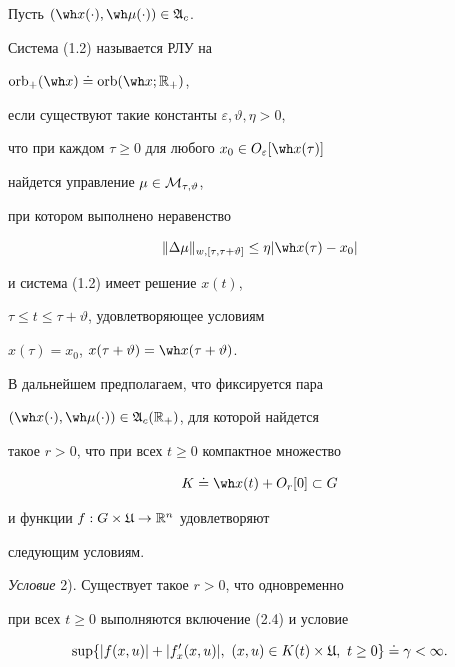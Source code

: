 \begin{defns}


Пусть $(\wh x(\cdot),\wh\mu(\cdot))\in\frak A_c$.


Система (1.2) называется РЛУ на


$\orb_+(\wh x)\doteq\orb(\wh x;\bR_+)$,


если существуют такие константы $\varepsilon,\vartheta,\eta>0$,


что при каждом $\tau\ge0$ для любого $x_0\in O_\varepsilon


[\wh x(\tau)]$


найдется управление $\mu\in\cal M_{\tau,\vartheta }$,


при котором выполнено неравенство


\begin{equation}


\|\Delta\mu\|_{w,[\tau,\tau+\vartheta]}\le\eta|\wh x(\tau)-x_0|


\end{equation}


и система (1.2) имеет решение $x(t)$,


$\tau\le t\le\tau+\vartheta$, удовлетворяющее условиям


$x(\tau)=x_0$, $x(\tau+\vartheta)=\wh x(\tau+\vartheta)$.


\end{defns}





В дальнейшем предполагаем, что фиксируется пара


$(\wh x(\cdot),\wh\mu(\cdot))\in\frak A_c(\bR_+)$, для которой найдется


такое $r>0$, что при всех $t\ge0$ компактное множество


\begin{equation}


K\doteq \wh x(t)+O_{r}[0]\subset G


\end{equation}


и функции $f:G\times\frak U\to\Bbb R^n$ удовлетворяют


следующим условиям.





{\it Условие} 2). Существует такое $r>0$, что одновременно


при всех $t\ge 0$ выполняются включение (2.4) и условие


\begin{equation}


\sup\{|f(x,u)|+|f'_{x}(x,u)|,\ (x,u)\in K(t)\times\frak U,\


t\ge 0\}\doteq\gamma<\infty.


\end{equation}





